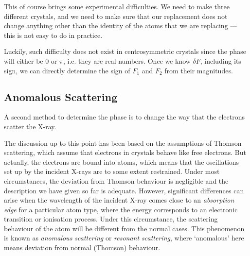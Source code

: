 \documentclass{article}
\theoremstyle{plain}\theoremheaderfont{\normalfont\itshape}\theorembodyfont{\rmfamily}\theoremseparator{.}\newtheorem*{rem}{Remark}\newtheorem*{ex}{Example}\newtheorem*{proof}{Proof}\newtheorem*{altp}{Alternative proof}
\theoremstyle{plain}\theoremheaderfont{\normalfont\bfseries}\theorembodyfont{\rmfamily}\theoremseparator{.}\newtheorem{thm}{Theorem}[section]\newtheorem{lem}[thm]{Lemma}\newtheorem{prop}[thm]{Proposition}\newtheorem*{cor}{Corollary}\newtheorem{defn}[thm]{Definition}\newtheorem{clm}[thm]{Claim}\newtheorem{clminproof}{Claim}\newtheorem*{law}{Law}\newtheorem{pos}[thm]{Postulate}
\theoremstyle{break}\theoremheaderfont{\normalfont\itshape}\theorembodyfont{\rmfamily}\theoremseparator{.\medskip}\newtheorem*{proofskip}{Proof}\newtheorem*{exs}{Examples}\newtheorem*{rems}{Remarks}
\theoremstyle{break}\theoremheaderfont{\normalfont\bfseries}\theorembodyfont{\rmfamily}\theoremseparator{.\medskip}\newtheorem{lemskip}[thm]{Lemma}\newtheorem{defnskip}[thm]{Definition}\newtheorem{propskip}[thm]{Proposition}\newtheorem{thmskip}[thm]{Theorem}
\numberwithin{equation}{section}
\begin{document}
    This of course brings some experimental difficulties. We need to make three different crystals, and we need to make sure that our replacement does not change anything other than the identity of the atoms that we are replacing --- this is not easy to do in practice.

    Luckily, such difficulty does not exist in centrosymmetric crystals since the phase will either be 0 or \(\pi\), i.e. they are real numbers. Once we know \(\delta F\), including its sign, we can directly determine the sign of \(F_1\) and \(F_2\) from their magnitudes.

    \subsection{Anomalous Scattering}
    A second method to determine the phase is to change the way that the electrons scatter the X-ray.

    The discussion up to this point has been based on the assumptions of Thomson scattering, which assume that electrons in crystals behave like free electrons. But actually, the electrons are bound into atoms, which means that the oscillations set up by the incident X-rays are to some extent restrained. Under most circumstances, the deviation from Thomson behaviour is negligible and the description we have given so far is adequate. However, significant differences can arise when the wavelength of the incident X-ray comes close to an \textit{absorption edge} for a particular atom type, where the energy corresponds to an electronic transition or ionisation process. Under this circumstance, the scattering behaviour of the atom will be different from the normal cases. This phenomenon is known as \textit{anomalous scattering} or \textit{resonant scattering}, where `anomalous' here means deviation from normal (Thomson) behaviour.

    \begin{figure}
        \centering
    \end{figure}
\end{document}
